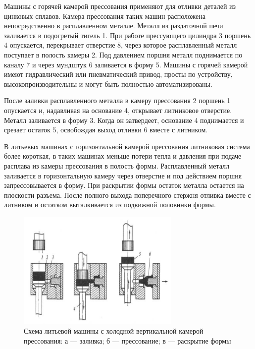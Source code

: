 \documentclass[unicode, 12pt, a4paper, oneside]{article}
\begin{document}
Машины с горячей камерой прессования применяют для отливки деталей из цинковых сплавов. Камера прессования таких машин расположена непосредственно в расплавленном металле. Металл из раздаточной печи заливается в подогретый тигель 1. При работе прессующего цилиндра 3 поршень 4 опускается, перекрывает отверстие 8, через которое расплавленный металл поступает в полость камеры 2. Под давлением поршня металл поднимается по каналу 7 и через мундштук 6 заливается в форму 5. Машины с горячей камерой имеют гидравлический или пневматический привод, просты по устройству, высокопроизводительны и могут быть полностью автоматизированы.

После заливки расплавленного металла в камеру прессования 2 поршень 1 опускается и, надавливая на основание 4, открывает литниковое отверстие. Металл заливается в форму 3. Когда он затвердеет, основание 4 поднимается и срезает остаток 5, освобождая выход отливки 6 вместе с литником.

В литьевых машинах с горизонтальной камерой прессования литниковая система более короткая, в таких машинах меньше потери тепла и давления при подаче расплава из камеры прессования в полость формы. Расплавленный металл заливается в горизонтальную камеру через отверстие и под действием поршня запрессовывается в форму. При раскрытии формы остаток металла остается на плоскости разъема. После полного выхода поперечного стержня отливка вместе с литником и остатком выталкивается из подвижной половинки формы.

\begin{figure}[htbp]
\centering
\includegraphics[width=0.7\textwidth]{97_form2.png}
\caption{Схема литьевой машины с холодной вертикальной  камерой прессования: а — заливка; б — прессование; в — раскрытие формы}
\label{fig:97_form2}
\end{figure}


\end{document}
